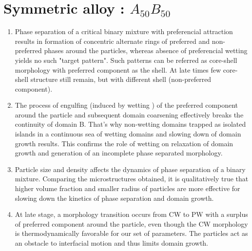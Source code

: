 \documentclass[12pt]{iiscthes}
\theoremstyle{definition}
\theoremstyle{definition}
\theoremstyle{remark}
\begin{document}
\section*{Symmetric alloy : $A_{50}B_{50}$}
\begin{enumerate}
\item
Phase separation of a critical binary mixture with preferencial attraction results in formation of concentric alternate rings of preferred and non-preferred phases around the particles, whereas absence of preferencial wetting yields no such "target pattern". Such patterns can be referred as core-shell morphology with preferred component as the shell. At late times few core-shell structure still remain, but with different shell (non-preferred component).
\item
The process of engulfing (induced by wetting ) of the preferred component around the particle and subsequent domain coarsening effectively breaks the continuity of domain B. That's why non-wetting domains trapped as isolated islands in a continuous sea of wetting domains and slowing down of domain growth results. This confirms the role of wetting on relaxation of domain growth and generation of an incomplete phase separated morphology.
\item
Particle size and density affects the dynamics of phase separation of a binary mixture. Comparing the microstructures obtained, it is qualitatively true that higher volume fraction and smaller radius of particles are more effective for slowing down the kinetics of phase separation and domain growth.
\item
At late stage, a morphology transition occurs from CW to PW with a surplus of preferred component around the particle, even though the CW morphology is thermodynamically favorable for our set of parameters. The particles act as an obstacle to interfacial motion and thus limits domain growth.
\end{enumerate}
\end{document}
